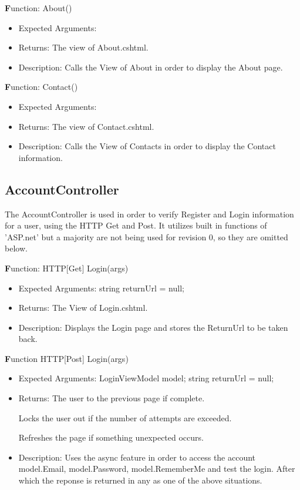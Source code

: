 \documentclass{scrreprt}
\begin{document}
  \textbf Function: About()
  \begin{itemize}
  \item Expected Arguments:
    
    \item Returns:
    The view of About.cshtml.
    \item Description:
    Calls the View of About in order to display the About page.
  \end{itemize}

  \textbf Function: Contact()
  \begin{itemize}
    \item Expected Arguments:
    
    \item Returns:
    The view of Contact.cshtml.
    \item Description:
    Calls the View of Contacts in order to display the Contact information.
  \end{itemize}

\subsection{AccountController}
The AccountController is used in order to verify Register and Login information for a user, using the HTTP Get and Post. It utilizes built in functions of 'ASP.net' but a majority are not being used for revision 0, so they are omitted below.

  \textbf Function:  HTTP[Get] Login(args)
  \begin{itemize}
    \item Expected Arguments:
    string returnUrl = null;
    \item Returns:
    The View of Login.cshtml.
    \item Description:
    Displays the Login page and stores the ReturnUrl to be taken back.
  \end{itemize}

  \textbf Function HTTP[Post] Login(args)
  \begin{itemize}
    \item Expected Arguments:
    LoginViewModel model;
    string returnUrl = null;
    \item Returns:
    The user to the previous page if complete.

    Locks the user out if the number of attempts are exceeded.

    Refreshes the page if something unexpected occurs.
    \item Description:
    Uses the async feature in order to access the account model.Email, model.Password, model.RememberMe and test the login. After which the reponse is returned in any as one of the above situations.
  \end{itemize}
\end{document}
